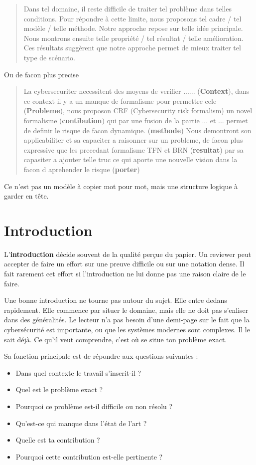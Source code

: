 \documentclass[11pt,a4paper]{article}
\theoremstyle{definition}
\begin{document}
\begin{quote}
Dans tel domaine, il reste difficile de traiter tel problème dans telles conditions. Pour répondre à cette limite, nous proposons tel cadre / tel modèle / telle méthode. Notre approche repose sur telle idée principale. Nous montrons ensuite telle propriété / tel résultat / telle amélioration. Ces résultats suggèrent que notre approche permet de mieux traiter tel type de scénario.
\end{quote}

Ou de facon plus precise 

\begin{quote}
La cybersecuriter necessitent des moyens de verifier ...... (\textbf{Context}), dans ce context il y a un manque de formalisme pour permettre cele (\textbf{Probleme}), nous proposon CRF (Cybersecurity risk formalism) un novel formalisme (\textbf{contibution}) qui par une fusion de la partie ... et ... permet de definir le risque de facon dynamique. (\textbf{methode}) Nous demontront son applicabiliter et sa capaciter a raisonner sur un probleme, de facon plus expressive que les precedant formalisme TFN et BRN (\textbf{resultat}) par sa capasiter a ajouter telle truc ce qui aporte une nouvelle vision dans la facon d aprehender le risque (\textbf{porter})
\end{quote}


Ce n'est pas un modèle à copier mot pour mot, mais une structure logique à garder en tête.



\section{Introduction}

L'\textbf{introduction} décide souvent de la qualité perçue du papier. Un reviewer peut accepter de faire un effort sur une preuve difficile ou sur une notation dense. Il fait rarement cet effort si l'introduction ne lui donne pas une raison claire de le faire.

Une bonne introduction ne tourne pas autour du sujet. Elle entre dedans rapidement. Elle commence par situer le domaine, mais elle ne doit pas s'enliser dans des généralités. Le lecteur n'a pas besoin d'une demi-page sur le fait que la cybersécurité est importante, ou que les systèmes modernes sont complexes. Il le sait déjà. Ce qu'il veut comprendre, c'est où se situe ton problème exact.

Sa fonction principale est de répondre aux questions suivantes :
\begin{itemize}
    \item Dans quel contexte le travail s'inscrit-il ?
    \item Quel est le problème exact ?
    \item Pourquoi ce problème est-il difficile ou non résolu ?
    \item Qu'est-ce qui manque dans l'état de l'art ?
    \item Quelle est ta contribution ?
    \item Pourquoi cette contribution est-elle pertinente ?
\end{itemize}
\end{document}
